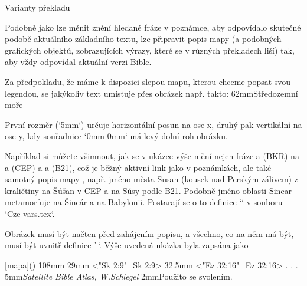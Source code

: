  Varianty překladu

Podobně jako lze měnit znění hledané fráze v poznámce, aby odpovídalo skutečné podobě aktuálního základního textu, lze připravit 
popis mapy (a podobných grafických objektů, zobrazujících výrazy, které se v různých překladech liší) tak, aby vždy odpovídal aktuální verzi Bible.

Za předpokladu, že máme k dispozici slepou mapu, kterou chceme popsat svou legendou, se jakýkoliv text umisťuje přes obrázek např. takto:
\begtt
\puttext 5mm 62mm{{\bi Středozemní moře}}
\endtt

První rozměr (`5mm`) určuje horizontální posun na ose x, druhý pak vertikální na ose y, kdy souřadnice `0mm 0mm` má levý dolní roh obrázku.





\medskip
{} 
\medskip
{}
\medskip
Například si můžete všimnout, jak se v ukázce výše mění nejen fráze  a  (BKR) na  a  (CEP) a 
a  (B21), což je běžný aktivní link jako v poznámkách, ale také samotný popis mapy , např. 
jméno města Susan (kousek nad Perským zálivem) z kraličtiny na Šúšan v CEP a na Súsy podle B21. Podobně jméno oblasti Sinear
metamorfuje na Šineár a na Babylonii. Postarají se o to definice `\vdef` v souboru `Cze-vars.tex`. 

Obrázek musí být načten před zahájením popisu, a všechno, co na něm má být, musí být uvnitř definice \`\insertBot`. 
Výše uvedená ukázka byla zapsána jako

\begtt
{}[mapa](){
  \Heros \cond {}\rm %
  \vskip-1mm 
\putstext 2mm 108mm {%
  }%
  \LMfonts \sans {}\rm
  \puttext 145mm 29mm {<"Sk 2:9"_Sk 2:9>}
  \puttext 145mm 32.5mm {<"Ez 32:16"_Ez 32:16>}
.
.
.
  \puttext 2mm 5mm{{\Heros {}\it Satellite Bible Atlas,\/ \rm W.Schlegel}}
  \puttext 2mm 2mm{\Heros {}\rm Použito se svolením.}
  }%
\endtt

